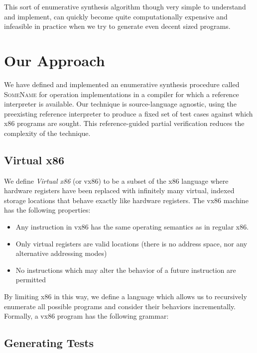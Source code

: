 \documentclass{article}
\newcommand{\nlsays}[1]{\todo[color=orange!40]{NL: #1}}
\begin{document}
This sort of enumerative synthesis algorithm though very simple to understand
and implement, can quickly become quite computationally expensive and
infeasible in practice when we try to generate even decent sized programs.

\section{Our Approach}
\label{sec:approach}

We have defined and implemented an enumerative synthesis procedure called
\textsc{SomeName} \nlsays{Will should give the tool a name.} for operation
implementations in a compiler for which a reference interpreter is available.
Our technique is source-language agnostic, using the preexisting reference
interpreter to produce a fixed set of test cases against which x86 programs
are sought.  This reference-guided partial verification reduces the complexity
of the technique.

\subsection{Virtual x86}

We define \textit{Virtual x86} (or vx86) to be a subset of the x86 language
where hardware registers have been replaced with infinitely many virtual,
indexed storage locations that behave exactly like hardware registers.  The
vx86 machine has the following properties:

\begin{itemize}
    \item Any instruction in vx86 has the same operating semantics as in
	regular x86.
    \item Only virtual registers are valid locations (there is no address
	space, nor any alternative addressing modes)
    \item No instructions which may alter the behavior of a future instruction
	are permitted
\end{itemize}

By limiting x86 in this way, we define a language which allows us to
recursively enumerate all possible programs and consider their behaviors
incrementally. Formally, a vx86 program has the following grammar:

\subsection{Generating Tests}
\end{document}
